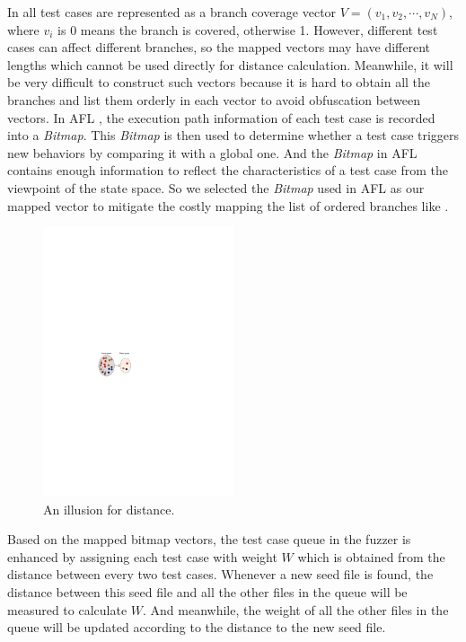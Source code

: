 In \cite{wang2015similarity} all test cases are represented as a branch coverage vector $\mathit{V}=(v_1, v_2, \cdots, v_N)$, where $v_i$ is 0 means the branch is covered, otherwise 1. 
However, different test cases can affect different branches, so the mapped vectors may have different lengths which cannot be used directly for distance calculation. Meanwhile, it will be very difficult to construct such vectors because it is hard to obtain all the branches and list them orderly in each vector to avoid obfuscation between vectors. 
In AFL \cite{online:afl}, the execution path information of each test case is recorded into a \emph{Bitmap}. This \emph{Bitmap} is then used to determine whether a test case triggers new behaviors by comparing it with a global one. And the \emph{Bitmap} in AFL contains enough information to reflect the characteristics of a test case from the viewpoint of the state space. 
So we selected the \emph{Bitmap} used in AFL as our mapped vector to mitigate the costly mapping the list of ordered branches like \cite{wang2015similarity}.

\begin{figure}
\centering
\includegraphics[width=0.5\textwidth]{figures/distance-illusion.pdf} 
\caption{An illusion for distance.}\label{distance-illusion}
\end{figure}

Based on the mapped bitmap vectors, the test case queue in the fuzzer is enhanced by assigning each test case with weight $W$ which is obtained from the distance between every two test cases. Whenever a new seed file is found, the distance between this seed file and all the other files in the queue will be measured to calculate $W$. And meanwhile, the weight of all the other files in the queue will be updated according to the distance to the new seed file. 

